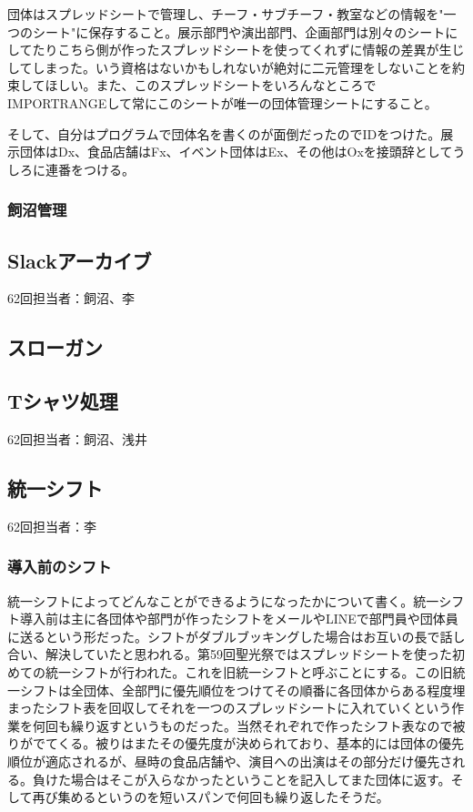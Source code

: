 \documentclass[dvipdfmx,jb5]{jarticle}
\begin{document}
 団体はスプレッドシートで管理し、チーフ・サブチーフ・教室などの情報を"一つのシート"に保存すること。展示部門や演出部門、企画部門は別々のシートにしてたりこちら側が作ったスプレッドシートを使ってくれずに情報の差異が生じしてしまった。いう資格はないかもしれないが絶対に二元管理をしないことを約束してほしい。また、このスプレッドシートをいろんなところでIMPORTRANGEして常にこのシートが唯一の団体管理シートにすること。

 そして、自分はプログラムで団体名を書くのが面倒だったのでIDをつけた。展示団体はDx、食品店舗はFx、イベント団体はEx、その他はOxを接頭辞としてうしろに連番をつける。
 \subsubsection{飼沼管理}

 \subsection{Slackアーカイブ}
 62回担当者：飼沼、李


 \subsection{スローガン}

 \subsection{Tシャツ処理}
 62回担当者：飼沼、浅井

 \subsection{統一シフト}\label{sec:統一シフト}
 62回担当者：李
  \subsubsection{導入前のシフト}
  統一シフトによってどんなことができるようになったかについて書く。統一シフト導入前は主に各団体や部門が作ったシフトをメールやLINEで部門員や団体員に送るという形だった。シフトがダブルブッキングした場合はお互いの長で話し合い、解決していたと思われる。第59回聖光祭ではスプレッドシートを使った初めての統一シフトが行われた。これを旧統一シフトと呼ぶことにする。この旧統一シフトは全団体、全部門に優先順位をつけてその順番に各団体からある程度埋まったシフト表を回収してそれを一つのスプレッドシートに入れていくという作業を何回も繰り返すというものだった。当然それぞれで作ったシフト表なので被りがでてくる。被りはまたその優先度が決められており、基本的には団体の優先順位が適応されるが、昼時の食品店舗や、演目への出演はその部分だけ優先される。負けた場合はそこが入らなかったということを記入してまた団体に返す。そして再び集めるというのを短いスパンで何回も繰り返したそうだ。
\end{document}
